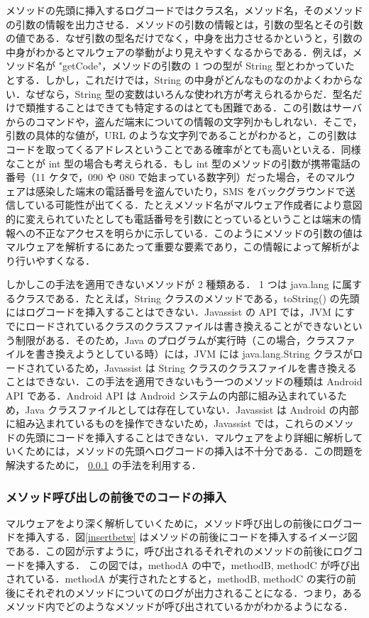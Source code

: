 メソッドの先頭に挿入するログコードではクラス名，メソッド名，そのメソッドの引数の情報を出力させる．メソッドの引数の情報とは，引数の型名とその引数の値である．なぜ引数の型名だけでなく，中身を出力させるかというと，引数の中身がわかるとマルウェアの挙動がより見えやすくなるからである．例えば，メソッド名が "getCode"，メソッドの引数の 1 つの型が String 型とわかっていたとする．しかし，これだけでは，String の中身がどんなものなのかよくわからない．なぜなら，String 型の変数はいろんな使われ方が考えられるからだ．型名だけで類推することはできても特定するのはとても困難である．この引数はサーバからのコマンドや，盗んだ端末についての情報の文字列かもしれない．そこで，引数の具体的な値が，URL のような文字列であることがわかると，この引数はコードを取ってくるアドレスということである確率がとても高いといえる．同様なことが int 型の場合も考えられる．もし int 型のメソッドの引数が携帯電話の番号（11 ケタで，090 や 080 で始まっている数字列）だった場合，そのマルウェアは感染した端末の電話番号を盗んでいたり，SMS をバックグラウンドで送信している可能性が出てくる．たとえメソッド名がマルウェア作成者により意図的に変えられていたとしても電話番号を引数にとっているということは端末の情報への不正なアクセスを明らかに示している．このようにメソッドの引数の値はマルウェアを解析するにあたって重要な要素であり，この情報によって解析がより行いやすくなる．

しかしこの手法を適用できないメソッドが 2 種類ある．
1 つは java.lang に属するクラスである．たとえば，String クラスのメソッドである，toString() の先頭にはログコードを挿入することはできない．Javassist の API では，JVM にすでにロードされているクラスのクラスファイルは書き換えることができないという制限がある．そのため，Java のプログラムが実行時（この場合，クラスファイルを書き換えようとしている時）には，JVM には java.lang.String クラスがロードされているため，Javassist は String  クラスのクラスファイルを書き換えることはできない．この手法を適用できないもう一つのメソッドの種類は Android API である．Android API は Android システムの内部に組み込まれているため，Java クラスファイルとしては存在していない．Javassist は Android の内部に組み込まれているものを操作できないため，Javassist では，これらのメソッドの先頭にコードを挿入することはできない．マルウェアをより詳細に解析していくためには，メソッドの先頭へログコードの挿入は不十分である．この問題を解決するために， \ref{methodcalls} の手法を利用する．

\subsubsection{メソッド呼び出しの前後でのコードの挿入}
\label{methodcalls}
マルウェアをより深く解析していくために，メソッド呼び出しの前後にログコードを挿入する．図\ref{insertbetw} はメソッドの前後にコードを挿入するイメージ図である．この図が示すように，呼び出されるそれぞれのメソッドの前後にログコードを挿入する．
この図では，methodA の中で，methodB, methodC が呼び出されている．methodA が実行されたとすると，methodB, methodC の実行の前後にそれぞれのメソッドについてのログが出力されることになる．つまり，あるメソッド内でどのようなメソッドが呼び出されているかがわかるようになる．

